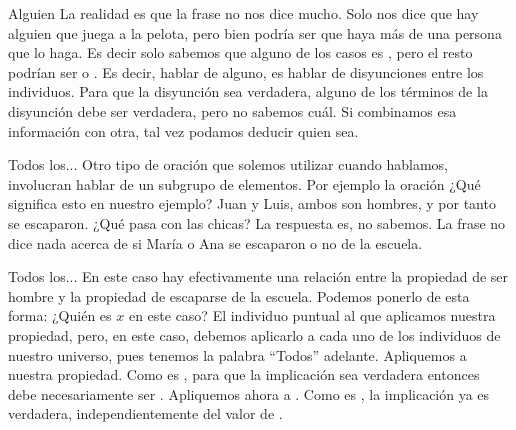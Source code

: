 \begin{frame}{Alguien}
  La realidad es que la frase no nos dice mucho. Solo nos
  dice que hay alguien que juega a la pelota, pero bien podría ser que haya más
  de una persona que lo haga.
  \jump
  Es decir solo sabemos que alguno de los casos es \fulltrue, pero el resto
  podrían ser \fullfalse o \fulltrue.
  \jump
  Es decir, hablar de alguno, es hablar de disyunciones entre los individuos.
  \jump
  \jump
  Para que la disyunción sea verdadera, alguno de los términos de la disyunción
  debe ser verdadera, pero no sabemos cuál. Si combinamos esa información con
  otra, tal vez podamos deducir quien sea.
\end{frame}


\begin{frame}{Todos los...}
  Otro tipo de oración que solemos utilizar cuando hablamos, involucran hablar
  de un subgrupo de elementos.
  \jump
  Por ejemplo la oración 
  \jump
  ¿Qué significa esto en nuestro ejemplo? Juan y Luis, ambos son hombres, y
  por tanto se escaparon.
  \jump
  ¿Qué pasa con las chicas? La respuesta es, no sabemos. La frase no dice nada
  acerca de si María o Ana se escaparon o no de la escuela.
\end{frame}


\begin{frame}{Todos los...}
  En este caso hay efectivamente una relación entre la propiedad de ser hombre
  y la propiedad de escaparse de la escuela. Podemos ponerlo de esta forma:
  \jump
  \jump
  ¿Quién es $x$ en este caso? El individuo puntual al que aplicamos nuestra
  propiedad, pero, en este caso, debemos aplicarlo a cada uno de los individuos
  de nuestro universo, pues tenemos la palabra ``Todos'' adelante.
  \jump
  Apliquemos a  nuestra propiedad. Como
   es \fulltrue, para que la implicación sea
  verdadera entonces  debe
  necesariamente ser \fulltrue.
  \jump
  Apliquemos ahora a . Como  es
  \fullfalse, la implicación ya es verdadera, independientemente del valor de
  .
\end{frame}

